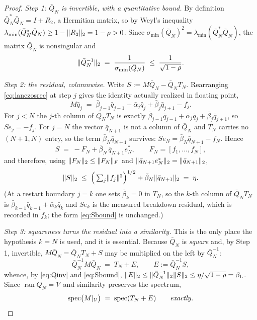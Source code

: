 \documentclass[11pt]{article}
\newcommand{\spec}{\operatorname{spec}}
\newcommand{\sigmin}{\sigma_{\min}}
\DeclarePairedDelimiter{\norm}{\lVert}{\rVert}
\begin{document}
\begin{proof}
\emph{Step 1: $\bar Q_N$ is invertible, with a quantitative bound.} By definition
$\bar Q_N^*\bar Q_N=I+R_2$, a Hermitian matrix, so by Weyl's inequality
$\lambda_{\min}(\bar Q_N^*\bar Q_N)\ge1-\norm{R_2}_2=1-\rho>0$. Since
$\sigmin(\bar Q_N)^2=\lambda_{\min}(\bar Q_N^*\bar Q_N)$, the matrix $\bar Q_N$ is nonsingular and
\begin{equation}\label{eq:Qinv}
  \norm{\bar Q_N^{-1}}_2\;=\;\frac{1}{\sigmin(\bar Q_N)}\;\le\;\frac{1}{\sqrt{1-\rho}} .
\end{equation}

\emph{Step 2: the residual, columnwise.} Write $S:=M\bar Q_N-\bar Q_NT_N$. Rearranging
\eqref{eq:lanczosrec} at step $j$ gives the identity actually realized in floating point,
\[
  M\bar q_j\;=\;\bar\beta_{j-1}\bar q_{j-1}+\bar\alpha_j\bar q_j+\bar\beta_j\bar q_{j+1}-f_j .
\]
For $j<N$ the $j$-th column of $\bar Q_NT_N$ is exactly
$\bar\beta_{j-1}\bar q_{j-1}+\bar\alpha_j\bar q_j+\bar\beta_j\bar q_{j+1}$, so $S e_j=-f_j$. For $j=N$
the vector $\bar q_{N+1}$ is not a column of $\bar Q_N$ and $T_N$ carries no $(N+1,N)$ entry, so the
term $\bar\beta_N\bar q_{N+1}$ survives: $Se_N=\bar\beta_N\bar q_{N+1}-f_N$. Hence
\[
  S\;=\;-F_N+\bar\beta_N\,\bar q_{N+1}e_N^{*},\qquad F_N=[f_1,\dots,f_N],
\]
and therefore, using $\norm{F_N}_2\le\norm{F_N}_F$ and $\norm{\bar q_{N+1}e_N^*}_2=\norm{\bar q_{N+1}}_2$,
\begin{equation}\label{eq:Sbound}
  \norm{S}_2\;\le\;\Big(\textstyle\sum_j\norm{f_j}^2\Big)^{1/2}+\bar\beta_N\norm{\bar q_{N+1}}_2\;=\;\eta .
\end{equation}
(At a restart boundary $j=k$ one sets $\bar\beta_k=0$ in $T_N$, so the $k$-th column of $\bar Q_NT_N$
is $\bar\beta_{k-1}\bar q_{k-1}+\bar\alpha_k\bar q_k$ and $Se_k$ is the measured breakdown residual,
which is recorded in $f_k$; the form \eqref{eq:Sbound} is unchanged.)

\emph{Step 3: squareness turns the residual into a similarity.} This is the only place the hypothesis
$k=N$ is used, and it is essential. Because $\bar Q_N$ is \emph{square} and, by Step 1, invertible,
$M\bar Q_N=\bar Q_NT_N+S$ may be multiplied on the left by $\bar Q_N^{-1}$:
\[
  \bar Q_N^{-1}M\bar Q_N\;=\;T_N+E,\qquad E:=\bar Q_N^{-1}S,
\]
whence, by \eqref{eq:Qinv} and \eqref{eq:Sbound},
$\norm{E}_2\le\norm{\bar Q_N^{-1}}_2\norm{S}_2\le\eta/\sqrt{1-\rho}=\beta_{\mathrm L}$. Since
$\operatorname{ran}\bar Q_N=\mathcal V$ and similarity preserves the spectrum,
\begin{equation}\label{eq:specequal}
  \spec\!\big(M|_{\mathcal V}\big)\;=\;\spec(T_N+E)\qquad\text{\emph{exactly}} .
\end{equation}


\end{proof}
\end{document}
